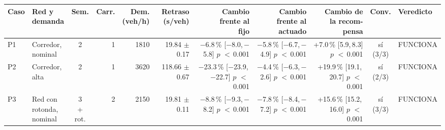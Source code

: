 \begin{table}[H]
\centering
\scriptsize
\setlength{\tabcolsep}{1.5pt}
\begin{tabular}{llcrrrrrrcl}
\toprule
Caso & \makecell[l]{Red y\\demanda} & Sem. & Carr. & \makecell{Dem.\\(veh/h)} & \makecell{Retraso\\(s/veh)} & \makecell{Cambio\\frente al\\fijo} & \makecell{Cambio\\frente al\\actuado} & \makecell{Cambio de\\la recom-\\pensa} & Conv. & Veredicto \\
\midrule
P1 & \makecell[l]{Corredor,\\{}nominal} & 2 & 1 & 1810 & \makecell[r]{19.84\\{}$\pm$ 0.17} & \makecell[r]{$-$6.8\,\%\\{}[$-$8.0,\,$-$5.8]\\$p$ $<$\,0.001} & \makecell[r]{$-$5.8\,\%\\{}[$-$6.7,\,$-$4.9]\\$p$ $<$\,0.001} & \makecell[r]{+7.0\,\%\\{}[5.9,\,8.3]\\$p$ $<$\,0.001} & \makecell[c]{sí\\{}(3/3)} & FUNCIONA \\
P2 & \makecell[l]{Corredor,\\{}alta} & 2 & 1 & 3620 & \makecell[r]{118.66\\{}$\pm$ 0.67} & \makecell[r]{$-$23.3\,\%\\{}[$-$23.9,\,$-$22.7]\\$p$ $<$\,0.001} & \makecell[r]{$-$4.4\,\%\\{}[$-$6.3,\,$-$2.6]\\$p$ $<$\,0.001} & \makecell[r]{+19.9\,\%\\{}[19.1,\,20.7]\\$p$ $<$\,0.001} & \makecell[c]{sí\\{}(2/3)} & FUNCIONA \\
P3 & \makecell[l]{Red con\\{}rotonda,\\{}nominal} & \makecell[c]{3\\{}+ rot.} & 2 & 2150 & \makecell[r]{19.81\\{}$\pm$ 0.11} & \makecell[r]{$-$8.8\,\%\\{}[$-$9.3,\,$-$8.2]\\$p$ $<$\,0.001} & \makecell[r]{$-$7.8\,\%\\{}[$-$8.4,\,$-$7.2]\\$p$ $<$\,0.001} & \makecell[r]{+15.6\,\%\\{}[15.2,\,16.0]\\$p$ $<$\,0.001} & \makecell[c]{sí\\{}(3/3)} & FUNCIONA \\

\end{tabular}
\end{table}
